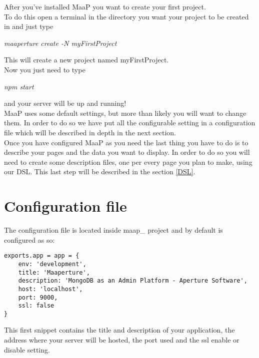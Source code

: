 After you've installed MaaP you want to create your first project.\\
To do this open a terminal in the directory you want your project to be created in and just type
\begin{center}
\textit{ maaperture create -N myFirstProject}
\end{center}

This will create a new project named myFirstProject.\\
Now you just need to type
\begin{center}
\textit{npm start}
\end{center}

and your server will be up and running!\\

MaaP uses some default settings, but more than likely you will want to change them. In order to do so we have put all the configurable setting in a configuration file which will be described in depth in the next section.\\

Once you have configured MaaP as you need the last thing you have to do is to describe your pages and the data you want to display.
In order to do so you will need to create some description files, one per every page you plan to make, using our DSL.
This last step will be described in the section \ref{DSL}.\\




\newpage
\section{Configuration file}

The configuration file is located inside   maap\_ project and by default is configured as so:\\


\begin{lstlisting}
exports.app = app = {
	env: 'development',
	title: 'Maaperture',
	description: 'MongoDB as an Admin Platform - Aperture Software',
	host: 'localhost',
	port: 9000,
	ssl: false
}

\end{lstlisting}

This first snippet contains the title and description of your application, the address where your server will be hosted, the port used and the ssl enable or disable setting.\\

